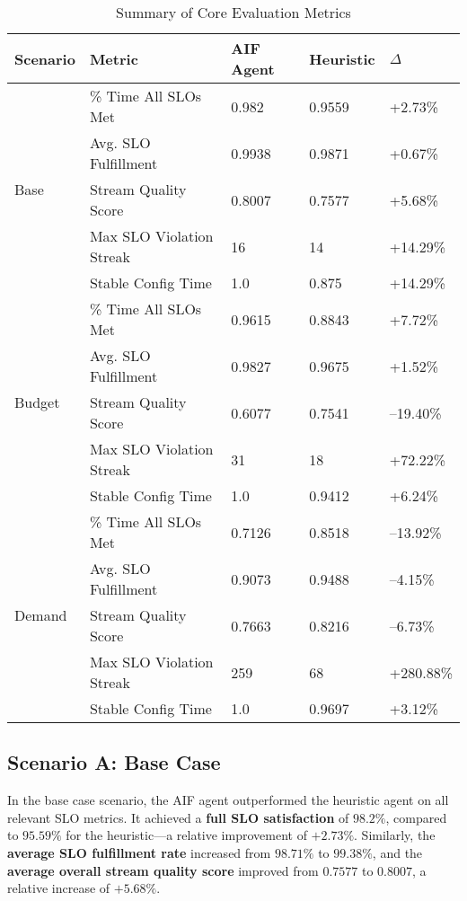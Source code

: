 \begin{table}[h!]
\centering
\caption{Summary of Core Evaluation Metrics}
\label{tab:results_summary}
\begin{tabular}{@{}lllll@{}}
\toprule
\textbf{Scenario} & \textbf{Metric} & \textbf{AIF Agent} & \textbf{Heuristic} & \textbf{$\Delta$} \\
\midrule
\multirow{5}{*}{Base} 
& \% Time All SLOs Met & 0.982 & 0.9559 & +2.73\% \\
& Avg. SLO Fulfillment & 0.9938 & 0.9871 & +0.67\% \\
& Stream Quality Score & 0.8007 & 0.7577 & +5.68\% \\
& Max SLO Violation Streak & 16 & 14 & +14.29\% \\
& Stable Config Time & 1.0 & 0.875 & +14.29\% \\
\midrule
\multirow{5}{*}{Budget} 
& \% Time All SLOs Met & 0.9615 & 0.8843 & +7.72\% \\
& Avg. SLO Fulfillment & 0.9827 & 0.9675 & +1.52\% \\
& Stream Quality Score & 0.6077 & 0.7541 & --19.40\% \\
& Max SLO Violation Streak & 31 & 18 & +72.22\% \\
& Stable Config Time & 1.0 & 0.9412 & +6.24\% \\
\midrule
\multirow{5}{*}{Demand} 
& \% Time All SLOs Met & 0.7126 & 0.8518 & --13.92\% \\
& Avg. SLO Fulfillment & 0.9073 & 0.9488 & --4.15\% \\
& Stream Quality Score & 0.7663 & 0.8216 & --6.73\% \\
& Max SLO Violation Streak & 259 & 68 & +280.88\% \\
& Stable Config Time & 1.0 & 0.9697 & +3.12\% \\
\bottomrule
\end{tabular}
\end{table}



\subsection{Scenario A: Base Case}

In the base case scenario, the AIF agent outperformed the heuristic agent on all relevant SLO metrics. It achieved a \textbf{full SLO satisfaction} of \(98.2\%\), compared to \(95.59\%\) for the heuristic---a relative improvement of \(+2.73\%\). Similarly, the \textbf{average SLO fulfillment rate} increased from \(98.71\%\) to \(99.38\%\), and the \textbf{average overall stream quality score} improved from \(0.7577\) to \(0.8007\), a relative increase of \(+5.68\%\).

